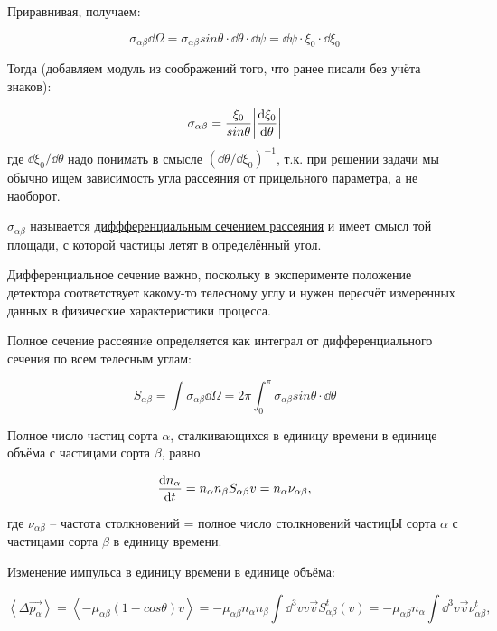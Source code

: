 \documentclass[10pt, a4paper]{article}
\begin{document}
Приравнивая, получаем:

\begin{equation*}
	\sigma_{\alpha\beta} \dd\Omega = \sigma_{\alpha\beta} sin\theta \cdot \dd\theta \cdot \dd\psi = \dd\psi \cdot \xi_0 \cdot \dd\xi_0
\end{equation*}

Тогда (добавляем модуль из соображений того, что ранее писали без учёта знаков):

\begin{equation} \label{eq:transport_cs}
	\sigma_{\alpha\beta} = \frac{\xi_0}{sin\theta}\abs{\dv{\xi_0}{\theta}}
\end{equation}
где $\dd\xi_0/\dd\theta$ надо понимать в смысле $(\dd\theta/\dd\xi_0)^{-1}$, т.к. при решении задачи мы обычно ищем зависимость угла рассеяния от прицельного параметра, а не наоборот.

$\sigma_{\alpha\beta}$ называется \uline{диффференциальным сечением рассеяния} и имеет смысл той площади, с которой частицы летят в определённый угол.

Дифференциальное сечение важно, поскольку в эксперименте положение детектора соответствует какому-то телесному углу и нужен пересчёт измеренных данных в физические характеристики процесса.

Полное сечение рассеяние определяется как интеграл от дифференциального сечения по всем телесным углам:

\begin{equation} \label{eq:total_cs}
	S_{\alpha\beta} = \int \sigma_{\alpha\beta} \dd\Omega = 2 \pi \int_{0}^{\pi} \sigma_{\alpha\beta} sin\theta \cdot \dd\theta
\end{equation}

Полное число частиц сорта $\alpha$, сталкивающихся в единицу времени в единице объёма с частицами сорта $\beta$, равно

\begin{equation*}
	\dv{n_\alpha}{t} = n_\alpha n_\beta S_{\alpha\beta} v = n_\alpha\nu_{\alpha\beta},
\end{equation*}

где $\nu_{\alpha\beta}$ -- частота столкновений = полное число столкновений частицЫ сорта $\alpha$ с частицами сорта $\beta$ в единицу времени.

Изменение импульса в единицу времени в единице объёма:

\begin{equation*}
	\left\langle \Delta \vec{p_\alpha}\right\rangle = \left\langle -\mu_{\alpha\beta}(1-cos\theta)v \right\rangle = -\mu_{\alpha\beta}n_\alpha n_\beta \int \dd^3v v \vec{v} S_{\alpha\beta}^t(v) = -\mu_{\alpha\beta}n_\alpha\int \dd^3v \vec{v}\nu_{\alpha\beta}^t,
\end{equation*}
\end{document}
